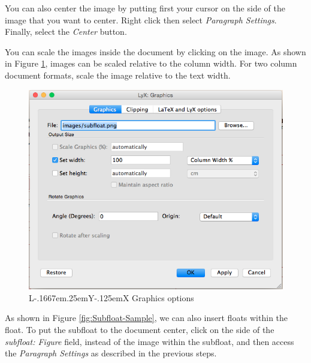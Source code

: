 \documentclass[english]{upeeei}
\makeatletter
\providecommand{\LyX}{L\kern-.1667em\lower.25em\hbox{Y}\kern-.125emX\@}
\makeatother
\begin{document}
You can also center the image by putting first your cursor on the
side of the image that you want to center. Right click then select
\textit{Paragraph Settings}. Finally, select the \textit{Center} button. 

You can scale the images inside the document by clicking on the image.
As shown in Figure \ref{fig:LyX-Graphics-options}, images can be
scaled relative to the column width. For two column document formats,
scale the image relative to the text width.

\begin{figure}[H]
\begin{centering}
\includegraphics[width=0.6\columnwidth]{images/image_scale}
\par\end{centering}
\caption{\protect\LyX{} Graphics options\label{fig:LyX-Graphics-options}}

\end{figure}

As shown in Figure \ref{fig:Subfloat-Sample}, we can also insert
floats within the float. To put the subfloat to the document center,
click on the side of the \textit{subfloat: Figure} field, instead
of the image within the subfloat, and then access the \textit{Paragraph
Settings} as described in the previous steps. 
\end{document}
